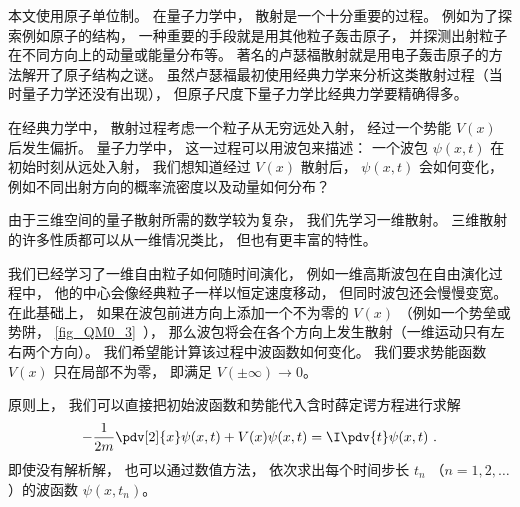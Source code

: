 
\begin{issues}
\issueTODO
\end{issues}


本文使用原子单位制。 在量子力学中， 散射是一个十分重要的过程。 例如为了探索例如原子的结构， 一种重要的手段就是用其他粒子轰击原子， 并探测出射粒子在不同方向上的动量或能量分布等。 著名的卢瑟福散射就是用电子轰击原子的方法解开了原子结构之谜。 虽然卢瑟福最初使用经典力学来分析这类散射过程（当时量子力学还没有出现）， 但原子尺度下量子力学比经典力学要精确得多。

在经典力学中， 散射过程考虑一个粒子从无穷远处入射， 经过一个势能 $V(x)$ 后发生偏折。 量子力学中， 这一过程可以用波包来描述： 一个波包 $\psi(x, t)$ 在初始时刻从远处入射， 我们想知道经过 $V(x)$ 散射后， $\psi(x, t)$ 会如何变化， 例如不同出射方向的概率流密度以及动量如何分布？

由于三维空间的量子散射所需的数学较为复杂， 我们先学习一维散射。 三维散射的许多性质都可以从一维情况类比， 但也有更丰富的特性。

我们已经学习了一维自由粒子如何随时间演化， 例如一维高斯波包在自由演化过程中， 他的中心会像经典粒子一样以恒定速度移动， 但同时波包还会慢慢变宽。 在此基础上， 如果在波包前进方向上添加一个不为零的 $V(x)$ （例如一个势垒或势阱， \autoref{fig_QM0_3}~）， 那么波包将会在各个方向上发生散射（一维运动只有左右两个方向）。 我们希望能计算该过程中波函数如何变化。 我们要求势能函数 $V(x)$ 只在局部不为零， 即满足 $V(\pm\infty) \to 0$。 

原则上， 我们可以直接把初始波函数和势能代入含时薛定谔方程进行求解
\begin{equation}\label{eq_Sca1D_1}
-\frac{1}{2m}\pdv[2]{x}\psi(x, t) + V(x) \psi(x, t) = \I \pdv{t} \psi(x, t)~.
\end{equation}
即使没有解析解， 也可以通过数值方法， 依次求出每个时间步长 $t_n$ （$n = 1, 2, \dots$）的波函数 $\psi(x, t_n)$。

